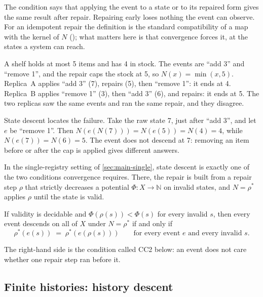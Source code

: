 The condition says that applying the event to a state or to its repaired form gives the same result
after repair. Repairing early loses nothing the event can observe. For an idempotent repair the definition is the
standard compatibility of a map with the kernel of $N$ (); what matters here is that
convergence forces it, at the states a system can reach.

\begin{example}[A shelf]\label{ex:shelf}
A shelf holds at most 5 items and has 4 in stock. The events are ``add 3'' and ``remove 1'', and the
repair caps the stock at 5, so $N(x) = \min(x, 5)$. Replica~A applies ``add 3'' (7), repairs (5), then
``remove 1'': it ends at 4. Replica~B applies ``remove 1'' (3), then ``add 3'' (6), and repairs: it
ends at 5. The two replicas saw the same events and ran the same repair, and they disagree.

State descent locates the failure. Take the raw state 7, just after ``add 3'', and let $e$ be
``remove 1''. Then $N(e(N(7))) = N(e(5)) = N(4) = 4$, while $N(e(7)) = N(6) = 5$. The event does not
descend at 7: removing an item before or after the cap is applied gives different answers.
\end{example}

In the single-registry setting of \cref{sec:main-single}, state descent is exactly one of the two
conditions convergence requires. There, the repair is built from a repair step $\rho$ that strictly
decreases a potential $\Phi : X \to \mathbb{N}$ on invalid states, and $N = \rho^{*}$ applies $\rho$
until the state is valid.

\begin{proposition}\label{prop:descent-cc2}
If validity is decidable and $\Phi(\rho(s)) < \Phi(s)$ for every invalid $s$, then every event descends on all of $X$ under
$N = \rho^{*}$ if and only if
\[
  \rho^{*}(e(s)) \;=\; \rho^{*}(e(\rho(s))) \qquad\text{for every event } e \text{ and every invalid } s.
\]
\end{proposition}

The right-hand side is the condition called CC2 below: an event does not care whether one repair
step ran before it.

\subsection{Finite histories: history descent}\label{sec:main-history}

